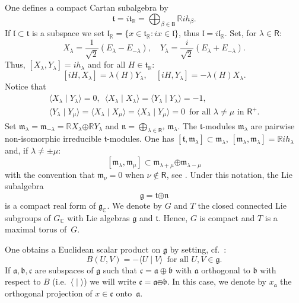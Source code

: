 \documentclass[a4paper,reqno]{amsart}
\theoremstyle{definition}
\theoremstyle{remark}
\theoremstyle{plain}
\numberwithin{equation}{section}
\newcommand{\C}{{\mathbb{C}}}
\newcommand{\R}{{\mathbb{R}}}
\newcommand{\g}{{\mathfrak{g}}}  %
\newcommand{\fm}{{\mathfrak{m}}}
\newcommand{\fn}{{\mathfrak{n}}}
\newcommand{\fl}{{\mathfrak{l}}}
\newcommand{\ft}{{\mathfrak{t}}}
\def\boplus{\mathbin{\boldsymbol{\oplus}}}
\newcommand{\ascal}[2]{{\langle {#1}  \mid {#2} \rangle}}
\newcommand{\tR}{{\mathfrak{t}_\R}}
\newcommand{\roots}{\mathsf{R}}
\newcommand{\proots}{\mathsf{R}^+}
\newcommand{\broots}{\mathsf{B}}
\newcommand{\halfsqrt}{{\frac{1}{\sqrt{2}}}}
\begin{document}
One defines a compact Cartan subalgebra by
\[
 \ft = i \tR = \bigoplus_{\beta \in \broots} \R ih_\beta.
\]
If $\fl \subset \ft$ is a subspace we set $\fl_\R= \{x \in \ft_\R
: ix \in \fl\}$, thus $\fl = i \fl_\R$.
Set, for $\lambda \in \roots$:
\begin{equation}
  \label{eq1.1}
  X_\lambda = \halfsqrt (E_\lambda - E_{-\lambda}),
  \quad Y_\lambda =\frac{i}{\sqrt{2}}
  (E_\lambda + E_{-\lambda}).
\end{equation}
Thus,  $[X_\lambda,Y_\lambda]  = ih_\lambda$ and  for all $H \in \tR$:
\begin{equation*}
  \label{eq1.2}
  [iH, X_\lambda] = \lambda(H) Y_\lambda, \quad   [iH,
  Y_\lambda] = -\lambda(H) X_\lambda. %
\end{equation*}
Notice that 
\begin{gather} \label{eq1.3a}
\ascal{X_\lambda}{Y_\lambda} =0, \ \; \ascal{X_\lambda}{X_\lambda} =
 \ascal{Y_\lambda}{Y_\lambda}= -1, \\
  \label{eq1.3}
 \ascal{Y_\lambda}{Y_\mu}= \ascal{X_\lambda}{X_\mu} =
  \ascal{X_\lambda}{Y_\mu}= 0 \ \; \text{for all $\lambda \neq
    \mu$ in $\proots$}.
\end{gather}
Set $\fm_\lambda =  \fm_{-\lambda} =\R X_\lambda \boplus \R
Y_\lambda$ and $\fn =
  \bigoplus_{\lambda \in \proots} \fm_\lambda$.
The $\ft$-modules $\fm_\lambda$ are pairwise non-isomorphic
irreducible $\ft$-modules. One has
$ [\ft, \fm_\lambda] \subset \fm_\lambda$,
$[\fm_\lambda,\fm_\lambda] = \R ih_\lambda$ and, if $\lambda
\neq \pm \mu$:
\begin{equation}
  \label{eq1.6a}
  [\fm_\lambda,\fm_\mu] \subset \fm_{\lambda+\mu} \boplus
  \fm_{\lambda-\mu}
 \end{equation}
 with the convention that $\fm_\nu = 0$ when $\nu \notin
 \roots$, see \cite[Lemma~9.2]{WG}.
Under this notation, the Lie subalgebra
\[
\g= \ft \boplus \fn
\]
is a compact real form of $\g_\C$.
We denote by $G$ and $T$ the closed connected Lie subgroups of
$G_\C$ with Lie algebras $\g$ and $\ft$. Hence, $G$ is compact
and $T$ is a maximal torus of~$G$.

One obtains a Euclidean scalar product on $\g$ by setting,
cf.~\cite[Chapitre~9, \S~1, p.~16]{Bou}:
\begin{equation*}
  \label{eq1.6}
  B(U,V)  = -  \ascal{U}{V} \ \; \text{for all $U,V \in \g$}.
\end{equation*}
If $\mathfrak{a} , \mathfrak{b},
\mathfrak{c}$ are subspaces  of $\g$ such that $\mathfrak{c} =
\mathfrak{a} \oplus \mathfrak{b}$ with $\mathfrak{a}$ orthogonal
to $\mathfrak{b}$ with respect to $B$ (i.e.~$\ascal{}{}$) we will write 
$\mathfrak{c} = \mathfrak{a} \obot \mathfrak{b}$.  In this case, we denote by
$x_{\mathfrak{a}}$ the orthogonal projection of $x \in \mathfrak{c}$
onto~$\mathfrak{a}$.
\end{document}
